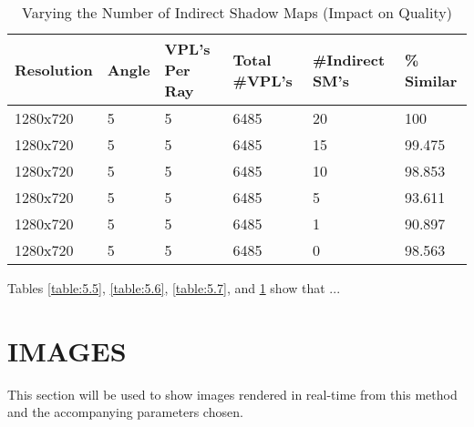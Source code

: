 \begin{table}[h!]
	\caption{Varying the Number of Indirect Shadow Maps (Impact on Quality)}
	\begin{center}
	    \begin{tabular}{ | l | l | l | l | l | l |}
	    \hline
	    Resolution & Angle & VPL's Per Ray & Total \#VPL's & \#Indirect SM's & \% Similar\\ \hline
	    1280x720 & 5 & 5 & 6485 & 20 & 100\\ \hline
	    1280x720 & 5 & 5 & 6485 & 15 & 99.475\\ \hline
	    1280x720 & 5 & 5 & 6485 & 10 & 98.853\\ \hline
	    1280x720 & 5 & 5 & 6485 & 5 & 93.611\\ \hline
	    1280x720 & 5 & 5 & 6485 & 1 & 90.897\\ \hline
	    1280x720 & 5 & 5 & 6485 & 0 & 98.563\\ \hline
	    \end{tabular}
	\end{center}
	\label{table:5.8}
\end{table}

Tables \ref{table:5.5}, \ref{table:5.6}, \ref{table:5.7}, and \ref{table:5.8} show that ...









\section{IMAGES}
This section will be used to show images rendered in real-time from this method and the accompanying parameters chosen.  

